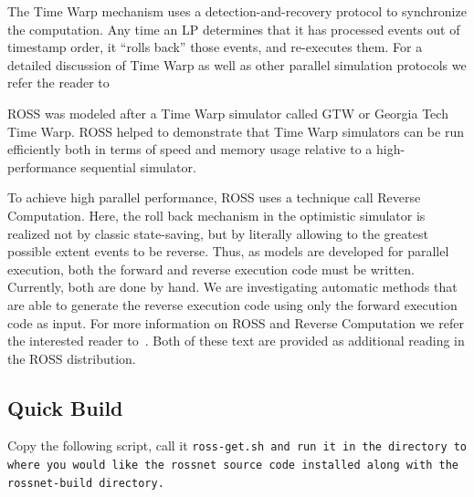 \documentclass[12pt]{article}
\begin{document}
The Time Warp mechanism uses a detection-and-recovery protocol to synchronize
the computation.  Any time an LP determines that it has processed events out
of timestamp order, it ``rolls back'' those events, and re-executes them. For
a detailed discussion of Time Warp as well as other parallel simulation
protocols we refer the reader to~\cite{fujimoto-cacm-1990}

ROSS was modeled after a Time Warp simulator called GTW or Georgia Tech Time
Warp\cite{das-wsc-1994}. ROSS helped to demonstrate that Time Warp simulators
can be run efficiently both in terms of speed and memory usage relative to a
high-performance sequential simulator.

To achieve high parallel performance, ROSS uses a technique call Reverse
Computation. Here, the roll back mechanism in the optimistic simulator is
realized not by classic state-saving, but by literally allowing to the
greatest possible extent events to be reverse. Thus, as models are developed
for parallel execution, both the forward and reverse execution code must be
written. Currently, both are done by hand. We are investigating automatic
methods that are able to generate the reverse execution code using only the
forward execution code as input. For more information on ROSS and Reverse
Computation we refer the interested reader to~\cite{carothers-tomacs-1999,
  carothers-pads-2000}. Both of these text are provided as additional reading
in the ROSS distribution.

\subsection{Quick Build}

Copy the following script, call it \tt{ross-get.sh} and run it in
the directory to where you would like the {\tt rossnet} source code
installed along with the {\tt rossnet-build} directory.
\end{document}
